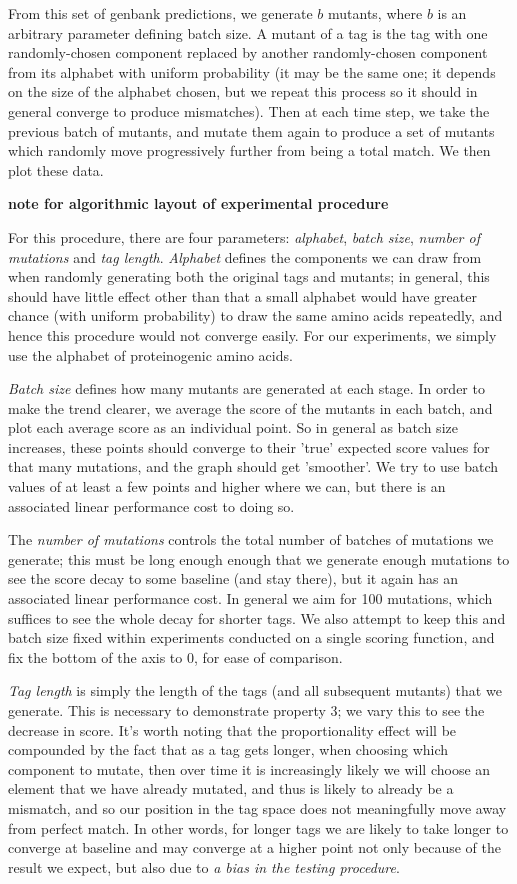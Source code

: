 \documentclass{l4proj}
\begin{document}
From this set of genbank predictions, we generate \(b\) mutants, where \(b\) is an arbitrary parameter defining batch size.  A mutant of a tag is the tag with one randomly-chosen component replaced by another randomly-chosen component from its alphabet with uniform probability (it may be the same one; it depends on the size of the alphabet chosen, but we repeat this process so it should in general converge to produce mismatches). Then at each time step, we take the previous batch of mutants, and mutate them again to produce a set of mutants which randomly move progressively further from being a total match. We then plot these data. 

\textbf{note for algorithmic layout of experimental procedure}

For this procedure, there are four parameters: \textit{alphabet}, \textit{batch size}, \textit{number of mutations} and \textit{tag length}. \textit{Alphabet} defines the components we can draw from when randomly generating both the original tags and mutants; in general, this should have little effect other than that a small alphabet would have greater chance (with uniform probability) to draw the same amino acids repeatedly, and hence this procedure would not converge easily. For our experiments, we simply use the alphabet of proteinogenic amino acids.

\textit{Batch size} defines how many mutants are generated at each stage. In order to make the trend clearer, we average the score of the mutants in each batch, and plot each average score as an individual point. So in general as batch size increases, these points should converge to their 'true' expected score values for that many mutations, and the graph should get 'smoother'. We try to use batch values of at least a few points and higher where we can, but there is an associated linear performance cost to doing so.

The \textit{number of mutations} controls the total number of batches of mutations we generate; this must be long enough enough that we generate enough mutations to see the score decay to some baseline (and stay there), but it again has an associated linear performance cost. In general we aim for 100 mutations, which suffices to see the whole decay for shorter tags. We also attempt to keep this and batch size fixed within experiments conducted on a single scoring function, and fix the bottom of the axis to 0, for ease of comparison.

\textit{Tag length} is simply the length of the tags (and all subsequent mutants) that we generate. This is necessary to demonstrate property 3; we vary this to see the decrease in score. It's worth noting that the proportionality effect will be compounded by the fact that as a tag gets longer, when choosing which component to mutate, then over time it is increasingly likely we will choose an element that we have already mutated, and thus is likely to already be a mismatch, and so our position in the tag space does not meaningfully move away from perfect match. In other words, for longer tags we are likely to take longer to converge at baseline and may converge at a higher point not only because of the result we expect, but also due to \textit{a bias in the testing procedure}. 
\end{document}
